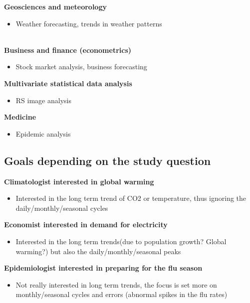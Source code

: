 \documentclass[10pt, a4paper]{article} %
\begin{document}
\noindent \textbf{Geosciences and meteorology}\\
\begin{itemize} 
\item Weather forecasting, trends in weather patterns\\
\end{itemize}
\\
\textbf{Business and finance (econometrics)}\\
\begin{itemize} 
\item Stock market analysis, business forecasting\\
\end{itemize} 
\noindent \textbf{Multivariate statistical data analysis}\\
\begin{itemize} 
\item RS image analysis\\
\end{itemize} 
\textbf{Medicine}\\
\begin{itemize}
\item Epidemic analysis
\end{itemize}


\subsection{Goals depending on the study question}%

\textbf{Climatologist interested in global warming}\\
\begin{itemize}
\item Interested in the long term trend of CO2 or temperature, thus ignoring the daily/monthly/seasonal cycles\\
\end{itemize}
\textbf{Economist interested in demand for electricity}\\
\begin{itemize}
\item Interested in the long term trends(due to population growth? Global warming?) but also the daily/monthly/seasonal peaks\\
\end{itemize}
\textbf{Epidemiologist interested in preparing for the flu season}\\
\begin{itemize}
\item  Not really interested in long term trends, the focus is set more on monthly/seasonal cycles and errors (abnormal spikes in the flu rates)
\end{itemize}
\end{document}
